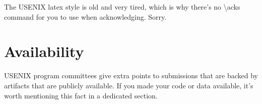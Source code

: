 The USENIX latex style is old and very tired, which is why
there's no \textbackslash{}acks command for you to use when
acknowledging. Sorry.

\section*{Availability}

USENIX program committees give extra points to submissions that are
backed by artifacts that are publicly available. If you made your code
or data available, it's worth mentioning this fact in a dedicated
section.







